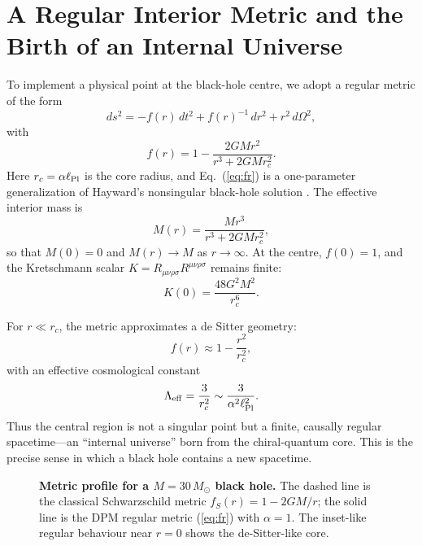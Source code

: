 \documentclass[11pt,a4paper]{article}
\begin{document}
\section{A Regular Interior Metric and the Birth of an Internal Universe}

To implement a physical point at the black-hole centre, we adopt a regular metric of the form
\begin{equation}
ds^2 = -f(r)\,dt^2 + f(r)^{-1}\,dr^2 + r^2\,d\Omega^2,
\label{eq:metric}
\end{equation}
with
\begin{equation}
f(r) = 1 - \frac{2GM r^2}{r^3 + 2GM r_c^2}.
\label{eq:fr}
\end{equation}
Here $r_c = \alpha \ell_{\rm Pl}$ is the core radius, and Eq.~(\ref{eq:fr}) is a one-parameter generalization of Hayward's nonsingular black-hole solution \cite{hayward2006}. The effective interior mass is
\begin{equation}
M(r) = \frac{M r^3}{r^3 + 2GM r_c^2},
\label{eq:mass}
\end{equation}
so that $M(0)=0$ and $M(r)\to M$ as $r\to\infty$. At the centre, $f(0)=1$, and the Kretschmann scalar $K = R_{\mu\nu\rho\sigma}R^{\mu\nu\rho\sigma}$ remains finite:
\begin{equation}
K(0) = \frac{48 G^2 M^2}{r_c^6}.
\label{eq:kretschmann}
\end{equation}

For $r \ll r_c$, the metric approximates a de Sitter geometry:
\begin{equation}
f(r) \approx 1 - \frac{r^2}{r_c^2},
\label{eq:desitter}
\end{equation}
with an effective cosmological constant
\begin{equation}
\Lambda_{\rm eff} = \frac{3}{r_c^2} \sim \frac{3}{\alpha^2 \ell_{\rm Pl}^2}.
\label{eq:lambda}
\end{equation}
Thus the central region is not a singular point but a finite, causally regular spacetime---an ``internal universe'' born from the chiral-quantum core. This is the precise sense in which a black hole contains a new spacetime.

\begin{figure}[htbp]
\centering
{}
\caption{\textbf{Metric profile for a $M = 30\,M_\odot$ black hole.} The dashed line is the classical Schwarzschild metric $f_S(r)=1-2GM/r$; the solid line is the DPM regular metric (\ref{eq:fr}) with $\alpha=1$. The inset-like regular behaviour near $r=0$ shows the de-Sitter-like core.}
\label{fig:metric}
\end{figure}
\end{document}
